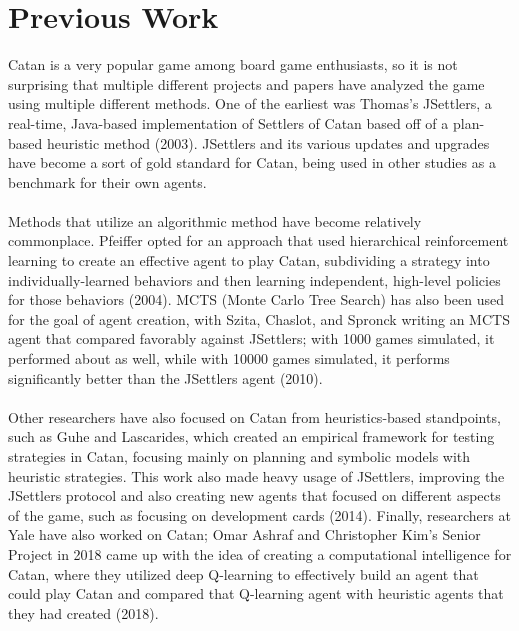 \documentclass[a4paper, 11pt]{article}
\begin{document}
\section{Previous Work}
Catan is a very popular game among board game enthusiasts, so it is not surprising that multiple different projects and papers have analyzed the game using multiple different methods. One of the earliest was Thomas's JSettlers, a real-time, Java-based implementation of Settlers of Catan based off of a plan-based heuristic method (2003). JSettlers and its various updates and upgrades have become a sort of gold standard for Catan, being used in other studies as a benchmark for their own agents.
\\ \\
\noindent Methods that utilize an algorithmic method have become relatively commonplace. Pfeiffer opted for an approach that used hierarchical reinforcement learning to create an effective agent to play Catan, subdividing a strategy into individually-learned behaviors and then learning independent, high-level policies for those behaviors (2004). MCTS (Monte Carlo Tree Search) has also been used for the goal of agent creation, with Szita, Chaslot, and Spronck writing an MCTS agent that compared favorably against JSettlers; with 1000 games simulated, it performed about as well, while with 10000 games simulated, it performs significantly better than the JSettlers agent (2010).
\\ \\
\noindent Other researchers have also focused on Catan from heuristics-based standpoints, such as Guhe and Lascarides, which created an empirical framework for testing strategies in Catan, focusing mainly on planning and symbolic models with heuristic strategies. This work also made heavy usage of JSettlers, improving the JSettlers protocol and also creating new agents that focused on different aspects of the game, such as focusing on development cards (2014). Finally, researchers at Yale have also worked on Catan; Omar Ashraf and Christopher Kim's Senior Project in 2018 came up with the idea of creating a computational intelligence for Catan, where they utilized deep Q-learning to effectively build an agent that could play Catan and compared that Q-learning agent with heuristic agents that they had created (2018).
\end{document}
